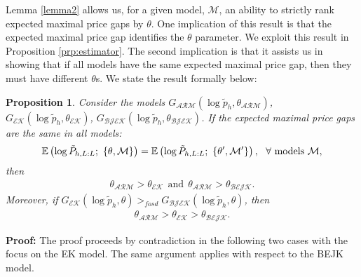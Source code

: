 \documentclass[12pt,dvips, ps2pdf]{article}
\newtheorem{prp}{Proposition}
\begin{document}
Lemma \ref{lemma2} allows us, for a given model, $\mathcal{M}$, an ability to strictly rank expected maximal price gaps by $\theta$. One implication of this result is that the expected maximal price gap identifies the $\theta$ parameter. We exploit this result in Proposition \ref{prp:estimator}. The second implication is that it assists us in showing that if all models have the same expected maximal price gap, then they must have different $\theta$s. We state the result formally below:
\begin{prp}
\label{prop:same_order_statistic}
Consider the models $G_{\mathcal{ARM}}(\log \tilde p_{h}, \theta_{\mathcal{ARM}})$, $G_{\mathcal{EK}}(\log \tilde p_{h}, \theta_{\mathcal{EK}} )$, $G_{\mathcal{BJEK}}(\log \tilde p_{h}, \theta_{\mathcal{BJEK}})$. If the expected maximal price gaps are the same in all models:
\begin{align}
\mathbb{E}\left(\log \tilde P_{h,L:L}; \ \left\{\theta,{\mathcal{M}}\right\}\right)=\mathbb{E}\left(\log \tilde P_{h,L:L}; \ \left\{\theta',{\mathcal{M'}}\right\}\right), \ \ \forall \ \text{models} \ \mathcal{M}, \notag
\end{align}
then
\begin{align*}
\theta_{\mathcal{ARM}} > \theta_{\mathcal{EK}} \ \ \mbox{and} \ \ \theta_{\mathcal{ARM}} > \theta_{\mathcal{BEJK}}.
\end{align*}
Moreover, if $G_{\mathcal{EK}}(\log \tilde p_{h}, \theta ) >_{fosd} G_{\mathcal{BJEK}}(\log \tilde p_{h}, \theta)$, then
\begin{align*}
\theta_{\mathcal{ARM}} > \theta_{\mathcal{EK}} > \theta_{\mathcal{BEJK}}.
\end{align*}
\end{prp}
\vspace{-.25cm}
\textbf{Proof:} The proof proceeds by contradiction in the following two cases with the focus on the EK model. The same argument applies with respect to the BEJK model.
\end{document}

